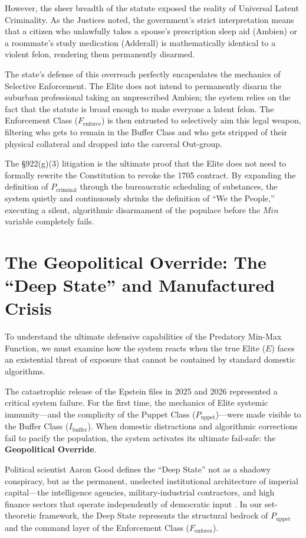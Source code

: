 \documentclass[12pt,openany]{book}
\begin{document}
However, the sheer breadth of the statute exposed the reality of Universal Latent Criminality. As the Justices noted, the government's strict interpretation means that a citizen who unlawfully takes a spouse's prescription sleep aid (Ambien) or a roommate's study medication (Adderall) is mathematically identical to a violent felon, rendering them permanently disarmed.

The state's defense of this overreach perfectly encapsulates the mechanics of Selective Enforcement. The Elite does not intend to permanently disarm the suburban professional taking an unprescribed Ambien; the system relies on the fact that the statute is broad enough to make everyone a latent felon. The Enforcement Class ($F_{\text{enforce}}$) is then entrusted to selectively aim this legal weapon, filtering who gets to remain in the Buffer Class and who gets stripped of their physical collateral and dropped into the carceral Out-group.

The \S922(g)(3) litigation is the ultimate proof that the Elite does not need to formally rewrite the Constitution to revoke the 1705 contract. By expanding the definition of $P_{\text{criminal}}$ through the bureaucratic scheduling of substances, the system quietly and continuously shrinks the definition of ``We the People,'' executing a silent, algorithmic disarmament of the populace before the $Min$ variable completely fails.

\section{The Geopolitical Override: The ``Deep State'' and Manufactured Crisis}

To understand the ultimate defensive capabilities of the Predatory Min-Max Function, we must examine how the system reacts when the true Elite ($E$) faces an existential threat of exposure that cannot be contained by standard domestic algorithms.

The catastrophic release of the Epstein files in 2025 and 2026 represented a critical system failure. For the first time, the mechanics of Elite systemic immunity---and the complicity of the Puppet Class ($P_{\text{uppet}}$)---were made visible to the Buffer Class ($I_{\text{buffer}}$). When domestic distractions and algorithmic corrections fail to pacify the population, the system activates its ultimate fail-safe: the \textbf{Geopolitical Override}.

Political scientist Aaron Good defines the ``Deep State'' not as a shadowy conspiracy, but as the permanent, unelected institutional architecture of imperial capital---the intelligence agencies, military-industrial contractors, and high finance sectors that operate independently of democratic input \cite{good}. In our set-theoretic framework, the Deep State represents the structural bedrock of $P_{\text{uppet}}$ and the command layer of the Enforcement Class ($F_{\text{enforce}}$).
\end{document}
